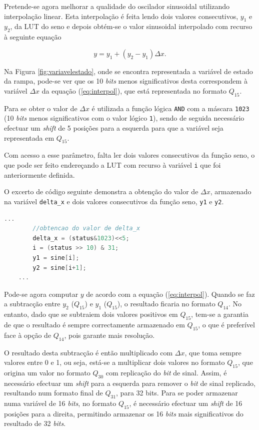 \documentclass[11pt]{article}
\numberwithin{equation}{section}
\begin{document}
Pretende-se agora melhorar a qualidade do oscilador sinusoidal utilizando interpolação linear. Esta interpolação é feita lendo dois valores consecutivos, $y_{1}$ e $y_{2}$, da LUT do seno e depois obtém-se o valor sinusoidal interpolado com recurso à seguinte equação

\vspace{-3mm}
\begin{equation}
	y = y_{1} + (y_{2} - y_{1})\Delta x.
	\label{eq:interpol}
\end{equation}

\vspace{1mm}
Na Figura \ref{fig:variavelestado}, onde se encontra representada a variável de estado da rampa, pode-se ver que os 10 \textit{bits} menos significativos desta correspondem à variável $\Delta x$ da equação (\ref{eq:interpol}), que está representada no formato $Q_{15}$.

Para se obter o valor de $\Delta x$ é utilizada a função lógica \texttt{AND} com a máscara \texttt{1023} (10 \textit{bits} menos significativos com o valor lógico \texttt{1}), sendo de seguida necessário efectuar um \textit{shift} de 5 posições para a esquerda para que a variável seja representada em $Q_{15}$.

Com acesso a esse parâmetro, falta ler dois valores consecutivos da função seno, o que pode ser feito endereçando a LUT com recurso à variável \texttt{i} que foi anteriormente definida.

O excerto de código seguinte demonstra a obtenção do valor de $\Delta x$, armazenado na variável \texttt{delta\_x} e dois valores consecutivos da função seno, \texttt{y1} e \texttt{y2}.

\begin{lstlisting}[language=C]
	...
		//obtencao do valor de delta_x
		delta_x = (status&1023)<<5;
		i = (status >> 10) & 31;
		y1 = sine[i];
		y2 = sine[i+1];
	...
\end{lstlisting}

Pode-se agora computar $y$ de acordo com a equação (\ref{eq:interpol}). Quando se faz a subtracção entre $y_2$ ($Q_{15}$) e $y_1$ ($Q_{15}$), o resultado ficaria no formato $Q_{14}$. No entanto, dado que se subtraiem dois valores positivos em $Q_{15}$, tem-se a garantia de que o resultado é sempre correctamente armazenado em $Q_{15}$, o que é preferível face à opção de $Q_{14}$, pois garante mais resolução. 

O resultado desta subtracção é então multiplicado com $\Delta x$, que toma sempre valores entre 0 e 1, ou seja, está-se a multiplicar dois valores no formato $Q_{15}$, que origina um valor no formato $Q_{30}$ com replicação do \textit{bit} de sinal. Assim, é necessário efectuar um \textit{shift} para a esquerda para remover o \textit{bit} de sinal replicado, resultando num formato final de $Q_{31}$, para 32 bits. Para se poder armazenar numa variável de 16 \textit{bits}, no formato $Q_{15}$, é necessário efectuar um \textit{shift} de 16 posições para a direita, permitindo armazenar os 16 \textit{bits} mais significativos do resultado de 32 \textit{bits}.
\end{document}
